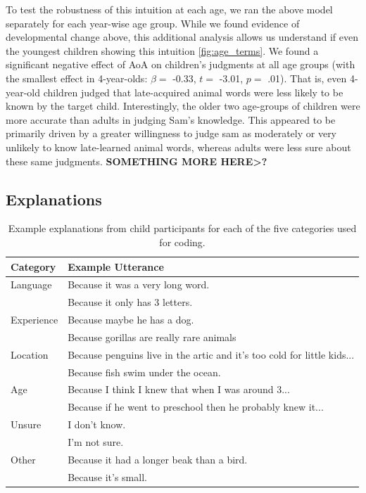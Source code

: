 \documentclass[10pt, letterpaper]{article}
\begin{document}
To test the robustness of this intuition at each age, we ran the above
model separately for each year-wise age group. While we found evidence
of developmental change above, this additional analysis allows us
understand if even the youngest children showing this intuition
\ref{fig:age_terms}. We found a significant negative effect of AoA on
children's judgments at all age groups (with the smallest effect in
4-year-olds: \(\beta =\) -0.33, \(t =\) -3.01, \(p =\) .01). That is,
even 4-year-old children judged that late-acquired animal words were
less likely to be known by the target child. Interestingly, the older
two age-groups of children were more accurate than adults in judging
Sam's knowledge. This appeared to be primarily driven by a greater
willingness to judge sam as moderately or very unlikely to know
late-learned animal words, whereas adults were less sure about these
same judgments. \textbf{SOMETHING MORE HERE\textgreater?}

\hypertarget{explanations}{%
\subsection{Explanations}\label{explanations}}

\begin{table}[tb]
\centering
\begin{tabular}{ll}
  \hline
Category & Example Utterance \\ 
  \hline
Language & Because it was a very long word. \\ 
    & Because it only has 3 letters. \\ 
  Experience & Because maybe he has a dog. \\ 
    & Because gorillas are really rare animals \\ 
  Location & Because penguins live in the artic and it's too cold for little kids... \\ 
    & Because fish swim under the ocean. \\ 
  Age & Because I think I knew that when I was around 3... \\ 
    & Because if he went to preschool then he probably knew it... \\ 
  Unsure & I don't know. \\ 
    & I'm not sure. \\ 
  Other & Because it had a longer beak than a bird. \\ 
    & Because it's small. \\ 
   \hline
\end{tabular}
\caption{Example explanations from child participants for each of the five categories used for coding.} 
\label{tab:explanations_table}
\end{table}
\end{document}
